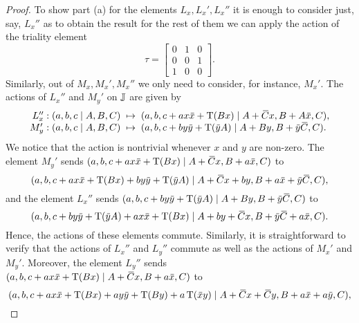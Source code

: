 \begin{proof}
	To show part (a) for the elements $L_x,L_x',L_x''$ it is enough to consider just, say, 
	$L_x''$ as to obtain the result for the rest of them we can apply the action of the 
	triality element
	\begin{equation*}
		\tau = \begin{bmatrix}
			0 & 1 & 0 \\
			0 & 0 & 1 \\
			1 & 0 & 0
		\end{bmatrix}.
	\end{equation*}
	Similarly, out of $M_x,M_x',M_x''$ we only need to consider, for instance, $M_x'$.
	The actions of $L_x''$ and $M_y'$ on $\mathbb{J}$ are given by
    \begin{equation}
    	\label{eq:1_q16_action}
        \begin{array}{r@{\;\;}c@{\;\;}l}
            L_x'': (a,b,c\mid A, B, C) & \mapsto &
            (a,b,c+a x \ovx  + \Tr(Bx) \mid A+\ovC x, B+A \ovx , C), \\
            M_y': (a,b,c\mid A,B,C) & \mapsto &
            (a,b,c+b y \ovy  + \Tr(\ovy A) \mid A + By, B+\ovy \ovC , C).
        \end{array}
    \end{equation}
    We notice that the action is nontrivial whenever $x$ and $y$ are non-zero. 
    The element $M_y'$ sends $(a,b,c+a x \ovx  + \Tr(Bx) \mid A+\ovC x, B+a
    \ovx , C)$ to
    \begin{equation*}
        (a,b,c+ax\ovx +\Tr(Bx)+by\ovy  + \Tr(\ovy A) \mid
            A+\ovC x + by, B+a\ovx  + \ovy \ovC , C ),
    \end{equation*}
    and the element $L_x''$ sends $(a,b,c+b y \ovy  + \Tr(\ovy A) \mid A + By, B+\ovy 
    \ovC , C)$ to
    \begin{equation*}
        (a,b,c+by\ovy  + \Tr(\ovy A) +ax\ovx  +\Tr(Bx) \mid A+by+\ovC x, B+\ovy \ovC 
        +a \ovx , C).
    \end{equation*}
    Hence, the actions of these elements commute. Similarly, it is straightforward to verify that
    the actions of $L_x''$ and $L_y''$ commute as well as the actions of $M_x'$ and $M_y'$.
    Moreover, the element $L_y''$ sends $(a,b,c+a x \ovx  + \Tr(Bx) \mid A+\ovC x, B+a
     \ovx , C)$ to
    \begin{equation*}
        (a,b,c+ax\ovx  + \Tr(Bx) + ay\ovy  + \Tr(By) + a\Tr(\ovx y) \mid
            A+\ovC x + \ovC y, B + a\ovx  + a\ovy , C),
    \end{equation*}

\end{proof}
